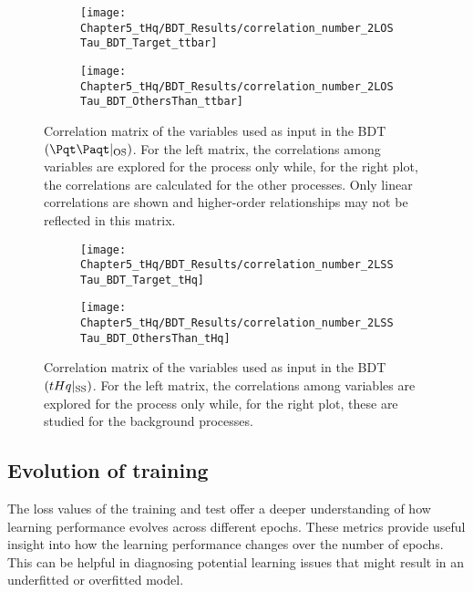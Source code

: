 \begin{figure}[h]
\centering
\begin{subfigure}{.475\textwidth}
  \centering
  \texttt{[image: Chapter5\_tHq/BDT\_Results/correlation\_number\_2LOSTau\_BDT\_Target\_ttbar]}
  \label{fig:ChaptH:EventSelection:BDT:Correlation:ttbarOS:target}
\end{subfigure}%
\begin{subfigure}{.475\textwidth}
  \centering
  \texttt{[image: Chapter5\_tHq/BDT\_Results/correlation\_number\_2LOSTau\_BDT\_OthersThan\_ttbar]}
  \label{fig:ChaptH:EventSelection:BDT:Correlation:ttbarOS:rest}
\end{subfigure}
\caption{Correlation matrix of the variables used as input in the BDT$(\ttbar|_{\text{OS}})$. 
For the left matrix, the correlations among variables are explored for the \ttbar process only while, for the right plot, the
correlations are calculated for the other processes. Only linear correlations are shown and higher-order relationships may not
be reflected in this matrix.}
\label{fig:ChaptH:EventSelection:BDT:Correlation:ttbarOS}
\end{figure}


\begin{figure}[h]
\centering
\begin{subfigure}{.475\textwidth}
  \centering
  \texttt{[image: Chapter5\_tHq/BDT\_Results/correlation\_number\_2LSSTau\_BDT\_Target\_tHq]}
  \label{fig:ChaptH:EventSelection:BDT:Correlation:tHqSS:target}
\end{subfigure}%
\begin{subfigure}{.475\textwidth}
  \centering
  \texttt{[image: Chapter5\_tHq/BDT\_Results/correlation\_number\_2LSSTau\_BDT\_OthersThan\_tHq]}
  \label{fig:ChaptH:EventSelection:BDT:Correlation:tHqSS:rest}
\end{subfigure}
\caption{Correlation matrix of the variables used as input in the BDT$(tHq|_{\text{SS}})$. 
For the left matrix, the correlations among variables are explored for the \tHq process only while, for the right plot, these
are studied for the background processes.}
\label{fig:ChaptH:EventSelection:BDT:Correlation:tHqSS}
\end{figure}


\subsection{Evolution of training}
\label{sec:BDT:AdditionalMaterial:Region:Evolution}
The loss values of the training and test offer a deeper understanding of how learning performance 
evolves across different epochs. These metrics provide useful insight into how the learning performance 
changes over the number of epochs. This can be helpful in diagnosing  potential learning issues that might 
result in an underfitted or overfitted model. %


